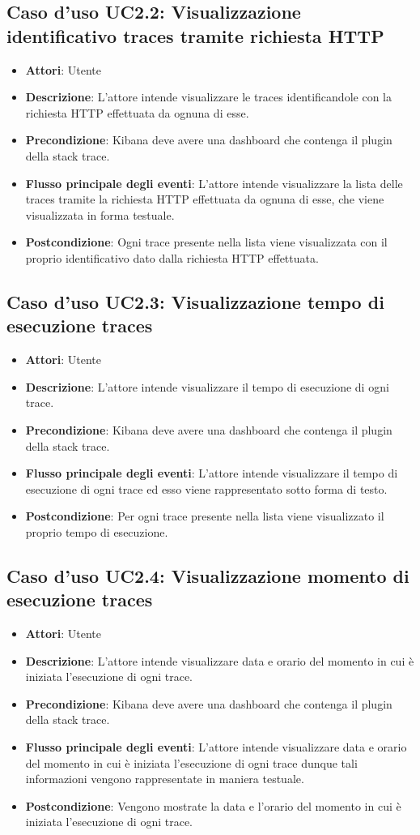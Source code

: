\subsection{Caso d'uso UC2.2: Visualizzazione identificativo traces tramite richiesta HTTP}
\begin{itemize}
\item \textbf{Attori}: Utente
\item \textbf{Descrizione}: L'attore intende visualizzare le traces identificandole con la richiesta HTTP effettuata da ognuna di esse.
\item \textbf{Precondizione}: Kibana deve avere una dashboard che contenga il plugin della stack trace.
\item \textbf{Flusso principale degli eventi}: L'attore intende visualizzare la lista delle traces tramite la richiesta HTTP effettuata da ognuna di esse, che viene visualizzata in forma testuale.
\item \textbf{Postcondizione}: Ogni trace presente nella lista viene visualizzata con il proprio identificativo dato dalla richiesta HTTP effettuata.
\end{itemize}
\subsection{Caso d'uso UC2.3: Visualizzazione tempo di esecuzione traces}
\begin{itemize}
\item \textbf{Attori}: Utente
\item \textbf{Descrizione}: L'attore intende visualizzare il tempo di esecuzione di ogni trace.
\item \textbf{Precondizione}: Kibana deve avere una dashboard che contenga il plugin della stack trace.
\item \textbf{Flusso principale degli eventi}: L'attore intende visualizzare il tempo di esecuzione di ogni trace ed esso viene rappresentato sotto forma di testo.
\item \textbf{Postcondizione}: Per ogni trace presente nella lista viene visualizzato il proprio tempo di esecuzione.
\end{itemize}
\subsection{Caso d'uso UC2.4: Visualizzazione momento di esecuzione traces}
\begin{itemize}
\item \textbf{Attori}: Utente
\item \textbf{Descrizione}: L'attore intende visualizzare data e orario del momento in cui è iniziata l'esecuzione di ogni trace.
\item \textbf{Precondizione}: Kibana deve avere una dashboard che contenga il plugin della stack trace.
\item \textbf{Flusso principale degli eventi}: L'attore intende visualizzare data e orario del momento in cui è iniziata l'esecuzione di ogni trace dunque tali informazioni vengono rappresentate in maniera testuale.
\item \textbf{Postcondizione}: Vengono mostrate la data e l'orario del momento in cui è iniziata l'esecuzione di ogni trace.
\end{itemize}
